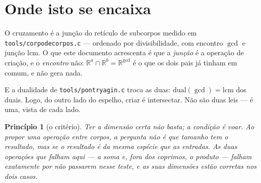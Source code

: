 \documentclass[11pt]{article}
\newcommand{\code}[1]{\texttt{\small #1}}
\newcommand{\R}{\mathbb R}
\theoremstyle{plain}
\newtheorem{principio}{Princípio}
\theoremstyle{remark}
\begin{document}
\section{Onde isto se encaixa}

O cruzamento é a junção do retículo de subcorpos medido em \code{tools/corpodecorpos.c} --- ordenado
por divisibilidade, com encontro $\gcd$ e junção $\mathrm{lcm}$. O que este documento acrescenta é que
a \emph{junção} é a operação de criação, e o \emph{encontro} não: $\R^a\cap\R^b=\R^{\gcd}$ é o que os
dois pais já tinham em comum, e não gera nada.

E a dualidade de \code{tools/pontryagin.c} troca as duas: $\mathrm{dual}(\gcd)=\mathrm{lcm}$ dos
duais. Logo, do outro lado do espelho, criar é intersectar. Não são duas leis --- é uma, vista de
cada lado.

\begin{principio}[o critério]
\emph{Ter a dimensão certa não basta; a condição é voar.} Ao propor uma operação entre corpos, a
pergunta não é que tamanho tem o resultado, mas se o resultado é da mesma espécie que as entradas. As
duas operações que falham aqui --- a soma e, fora dos coprimos, o produto --- falham exatamente por
não passarem nesse teste, e as suas dimensões estão corretas nos dois casos.
\end{principio}
\end{document}
